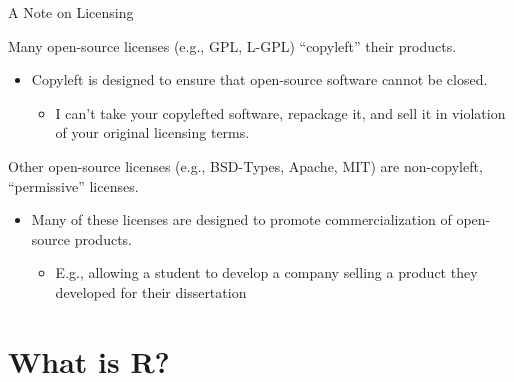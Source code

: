 \documentclass[10pt]{beamer}
\begin{document}
{\begin{frame}{A Note on Licensing}

  Many open-source licenses (e.g., GPL, L-GPL) ``copyleft'' their products.
  \vb
  \begin{itemize}
  \item Copyleft is designed to ensure that open-source software cannot be 
    closed.
    \vc
    \begin{itemize}
    \item I can't take your copylefted software, repackage it, and sell it in 
      violation of your original licensing terms.
    \end{itemize}
  \end{itemize}
  \va
  Other open-source licenses (e.g., BSD-Types, Apache, MIT) are non-copyleft, 
  ``permissive'' licenses.
  \vb
  \begin{itemize}
  \item Many of these licenses are designed to promote commercialization of 
    open-source products.
    \vc
    \begin{itemize}
    \item E.g., allowing a student to develop a company selling a product they 
      developed for their dissertation
    \end{itemize}
  \end{itemize}
  
\end{frame}


}%

\section{What is R?}

\end{document}

